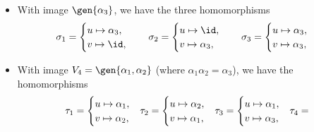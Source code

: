\begin{solalph}
\begin{itemize}
\begin{itemize}
\[            \rho_2 =
            \begin{cases}
                u \mapsto \id, \\
                v \mapsto \alpha_2,
            \end{cases} \quad
            \rho_3 =
            \begin{cases}
                u \mapsto \alpha_2, \\
                v \mapsto \alpha_2,
            \end{cases}\]
            \item With image $\gen{\alpha_3}$, we have the three homomorphisms
            \[\sigma_1 = 
            \begin{cases}
                u \mapsto \alpha_3, \\
                v \mapsto \id,
            \end{cases} \quad
            \sigma_2 =
            \begin{cases}
                u \mapsto \id, \\
                v \mapsto \alpha_3,
            \end{cases} \quad
            \sigma_3 =
            \begin{cases}
                u \mapsto \alpha_3, \\
                v \mapsto \alpha_3,
            \end{cases}\]
            \item With image $V_4 = \gen{\alpha_1, \alpha_2}$ (where $\alpha_1\alpha_2 = \alpha_3$), we have the homomorphisms
            \[\tau_1 = 
            \begin{cases}
                u \mapsto \alpha_1, \\
                v \mapsto \alpha_2,
            \end{cases} \hspace{-2pt}
            \tau_2 =
            \begin{cases}
                u \mapsto \alpha_2, \\
                v \mapsto \alpha_1,
            \end{cases} \hspace{-2pt}
            \tau_3 =
            \begin{cases}
                u \mapsto \alpha_1, \\
                v \mapsto \alpha_3,
            \end{cases} \hspace{-2pt}
            \tau_4 =
\]
\end{itemize}
\end{itemize}
\end{solalph}

